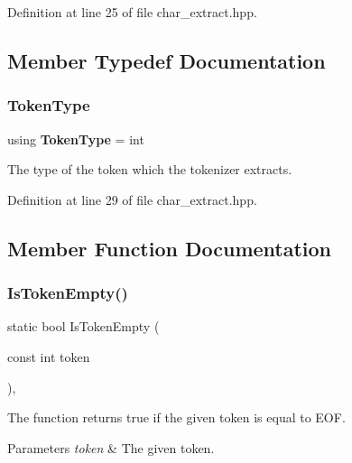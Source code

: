 Definition at line 25 of file char\+\_\+extract.\+hpp.



\subsection{Member Typedef Documentation}
\mbox{\label{classmlpack_1_1data_1_1CharExtract_a80e7e247aa7b4392b900c808645a26cb}} 
\subsubsection{Token\+Type}
{\footnotesize\ttfamily using \textbf{ Token\+Type} =  int}



The type of the token which the tokenizer extracts. 



Definition at line 29 of file char\+\_\+extract.\+hpp.



\subsection{Member Function Documentation}
\mbox{\label{classmlpack_1_1data_1_1CharExtract_a68ac0f257a34674662078d3303c25b99}} 
\subsubsection{Is\+Token\+Empty()}
{\footnotesize\ttfamily static bool Is\+Token\+Empty (\begin{DoxyParamCaption}\item[{const int}]{token }\end{DoxyParamCaption})\hspace{0.3cm}{\ttfamily [inline]}, {\ttfamily [static]}}



The function returns true if the given token is equal to E\+OF. 


\begin{DoxyParams}{Parameters}
{\em token} & The given token. \\
\hline
\end{DoxyParams}


